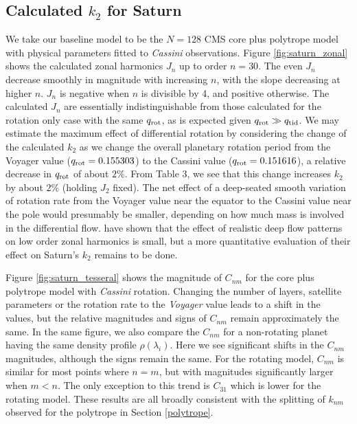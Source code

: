 \subsection{Calculated $k_2$ for Saturn} \label{calc_k2}

We take our baseline model to be the $N=128$ CMS core plus polytrope model with
physical parameters fitted to \textit{Cassini} observations. Figure
\ref{fig:saturn_zonal} shows the calculated zonal harmonics $J_n$ up to order
$n=30$.  The even $J_n$ decrease smoothly in magnitude with increasing $n$,
with the slope decreasing at higher $n$.  $J_n$ is negative when $n$ is
divisible by 4, and positive otherwise.  The calculated $J_n$ are essentially
indistinguishable from those calculated for the rotation only case with the
same $q_{\rm rot}$, as is expected given $q_{\rm rot} \gg q_{\rm tid}$. We may
estimate the maximum effect of differential rotation by considering the change
of the calculated $k_2$ as we change the overall planetary rotation period from
the Voyager value ($q_{\rm rot} = 0.155303$) to the Cassini value ($q_{\rm rot}
= 0.151616$), a relative decrease in $q_{\rm rot} $ of about $2 \%$.  From
Table 3, we see that this change increases $k_2$ by about $2 \%$ (holding $J_2$
fixed).  The net effect of a deep-seated smooth variation of rotation rate from
the Voyager value near the equator to the Cassini value near the pole would
presumably be smaller, depending on how much mass is involved in the
differential flow.  \citet{cao2015} have shown that the effect of
realistic deep flow patterns on low order zonal harmonics is small, but a more
quantitative evaluation of their effect on Saturn's $k_2$ remains to be done.

Figure \ref{fig:saturn_tesseral} shows the magnitude of $C_{nm}$ for the core plus
polytrope model with \textit{Cassini} rotation. Changing the number of layers,
satellite parameters or the rotation rate to the \textit{Voyager} value leads to a
shift in the values, but the relative magnitudes and signs of $C_{nm}$ remain
approximately the same. In the same figure, we also compare the $C_{nm}$ for a
non-rotating planet having the same density profile $\rho( \lambda_i)$. Here we see
significant shifts in the $C_{nm}$ magnitudes, although the signs remain the same.
For the rotating model, $C_{nm}$ is similar for most points where $n=m$, but with
magnitudes significantly larger when $m<n$. The only exception to this trend is
$C_{31}$ which is lower for the rotating model. These results are all broadly
consistent with the splitting of $k_{nm}$ observed for the polytrope in Section
\ref{polytrope}.

